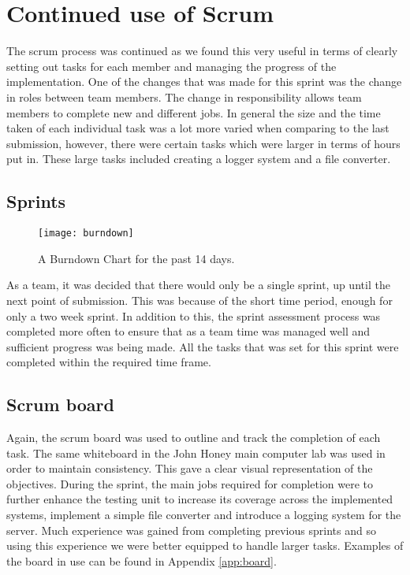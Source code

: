 \section{Continued use of Scrum}
The scrum process was continued as we found this very useful in terms of clearly setting out tasks for each member and managing the progress of the implementation. One of the changes that was made for this sprint was the change in roles between team members. The change in responsibility allows team members to complete new and different jobs. In general the size and the time taken of each individual task was a lot more varied when comparing to the last submission, however, there were certain tasks which were larger in terms of hours put in. These large tasks included creating a logger system and a file converter.
\subsection{Sprints}

\begin{figure}[h]
	\centering
	\texttt{[image: burndown]}
	\caption{A Burndown Chart for the past 14 days.}\label{fig:burn}
\end{figure}

As a team, it was decided that there would only be a single sprint, up until the next point of submission. This was because of the short time period, enough for only a two week sprint. In addition to this, the sprint assessment process was completed more often to ensure that as a team time was managed well and sufficient progress was being made. All the tasks that was set for this sprint were completed within the required time frame.
\subsection{Scrum board}
Again, the scrum board was used to outline and track the completion of each task. The same whiteboard in the John Honey main computer lab was used in order to maintain consistency. This gave a clear visual representation of the objectives. During the sprint, the main jobs required for completion were to further enhance the testing unit to increase its coverage across the implemented systems, implement a simple file converter and introduce a logging system for the server. Much experience was gained from completing previous sprints and so using this experience we were better equipped to handle larger tasks. Examples of the board in use can be found in Appendix \ref{app:board}.

